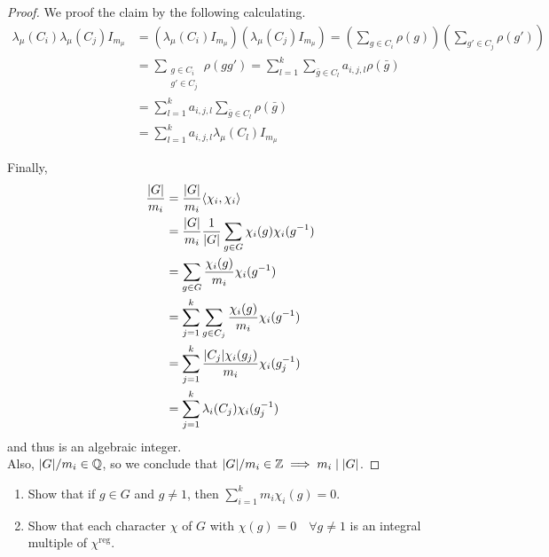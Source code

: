 \begin{theorem}[Divisibility]
\begin{proof}
    We proof the claim by the following calculating.
    \begin{align*}
      \lambda_\mu(C_i)\lambda_\mu(C_j) I_{m_\mu}
      &= \left(\lambda_\mu(C_i) I_{m_\mu}\right)
         \left(\lambda_\mu(C_j) I_{m_\mu}\right)
      = \left(\sum_{g\in C_i} \rho(g)\right)
         \left(\sum_{g'\in C_j} \rho(g')\right) \\
      &= \sum_{\substack{g\in C_i\\ g'\in C_j}} \rho(gg')
      = \sum_{l=1}^k \sum_{\bar{g}\in C_l} a_{i,j,l}\rho(\bar{g}) \\
      &= \sum_{l=1}^k a_{i,j,l} \sum_{\bar{g}\in C_l}\rho(\bar{g}) \\
      &= \sum_{l=1}^k a_{i,j,l} \lambda_\mu(C_l) I_{m_\mu}
   \end{align*}

   Finally,
   \begin{align*}
     \frac{\lvert G\rvert}{m_i}
     &= \frac{\lvert G\rvert}{m_i} \langle\chi_i, \chi_i\rangle \\
     &= \frac{\lvert G\rvert}{m_i} \frac{1}{\lvert G\rvert} \sum_{g\in G}
     \chi_i(g) \chi_i(g^{-1}) \\
     &= \sum_{g\in G} \frac{\chi_i(g)}{m_i} \chi_i(g^{-1}) \\
     &= \sum_{j=1}^k \sum_{g\in C_j} \frac{\chi_i(g)}{m_i} \chi_i(g^{-1}) \\
     &= \sum_{j=1}^k \frac{\lvert C_j\rvert\chi_i(g_j)}{m_i} \chi_i(g_j^{-1}) \\
     &= \sum_{j=1}^k \lambda_i(C_j) \chi_i(g_j^{-1}) \\
   \end{align*}
   and thus is an algebraic integer. \\
   Also, $\lvert G\rvert / m_i \in \mathbb{Q}$, so we conclude that
   $\lvert G\rvert / m_i \in \mathbb{Z} \implies m_i \mid \lvert G\rvert$.
  \end{proof}
\end{theorem}

\begin{exercise} \mbox{}
  \begin{enumerate}
    \item Show that if $g\in G$ and $g\ne 1$, then
      $\sum_{i=1}^k m_i\chi_i(g) = 0$.
    \item Show that each character $\chi$ of $G$ with $\chi(g) = 0 \quad
      \forall g \ne 1$ is an integral multiple of $\chi^\text{reg}$.
  \end{enumerate}
\end{exercise}

